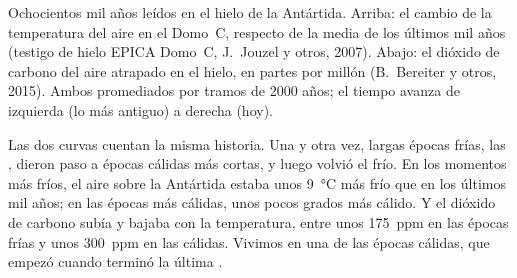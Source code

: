 \begin{omfigure}

{\small Ochocientos mil años leídos en el hielo de la Antártida. Arriba:
el cambio de la temperatura del aire en el Domo~C, respecto de la media de
los últimos mil años (testigo de hielo EPICA Domo~C, J.~Jouzel y otros,
2007). Abajo: el dióxido de carbono del aire atrapado en el hielo, en
partes por millón (B.~Bereiter y otros, 2015). Ambos promediados por
tramos de \num{2000} años; el tiempo avanza de izquierda (lo más antiguo) a
derecha (hoy).}
\label{fig:g9:climate-past-and-present:icecore}
\end{omfigure}

Las dos curvas cuentan la misma historia. Una y otra vez, largas épocas
frías, las , dieron paso a épocas cálidas más cortas, y luego
volvió el frío. En los momentos más fríos, el aire sobre la Antártida
estaba unos \qty{9}{\degreeCelsius} más frío que en los últimos mil años;
en las épocas más cálidas, unos pocos grados más cálido. Y el dióxido de
carbono subía y bajaba con la temperatura, entre unos \qty{175}{ppm} en las
épocas frías y unos \qty{300}{ppm} en las cálidas. Vivimos en una de las
épocas cálidas, que empezó cuando terminó la última .

